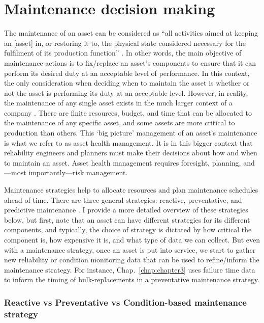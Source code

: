 \section{Maintenance decision making}
\label{sec:decisions}

The maintenance of an asset can be considered as ``all activities aimed at keeping an [asset] in, or restoring it to, the physical state considered necessary for the fulfilment of its production function'' \citep{geraerds1985}. In other words, the main objective of maintenance actions is to fix/replace an asset's components to ensure that it can perform its desired duty at an acceptable level of performance. In this context, the only consideration when deciding when to maintain the asset is whether or not the asset is performing its duty at an acceptable level. However, in reality, the maintenance of any single asset exists in the much larger context of a company \citep{jardine2013}. There are finite resources, budget, and time that can be allocated to the maintenance of any specific asset, and some assets are more critical to production than others. This `big picture' management of an asset's maintenance is what we refer to as asset health management. It is in this bigger context that reliability engineers and planners must make their decisions about how and when to maintain an asset. Asset health management requires foresight, planning, and---most importantly---risk management.

Maintenance strategies help to allocate resources and plan maintenance schedules ahead of time. There are three general strategies: reactive, preventative, and predictive maintenance \citep{jardine2013}. I provide a more detailed overview of these strategies below, but first, note that an asset can have different strategies for its different components, and typically, the choice of strategy is dictated by how critical the component is, how expensive it is, and what type of data we can collect. But even with a maintenance strategy, once an asset is put into service, we start to gather new reliability or condition monitoring data that can be used to refine/inform the maintenance strategy. For instance, Chap.~\ref{chap:chapter3} uses failure time data to inform the timing of bulk-replacements in a preventative maintenance strategy.

\subsubsection*{Reactive vs Preventative vs Condition-based maintenance strategy}

